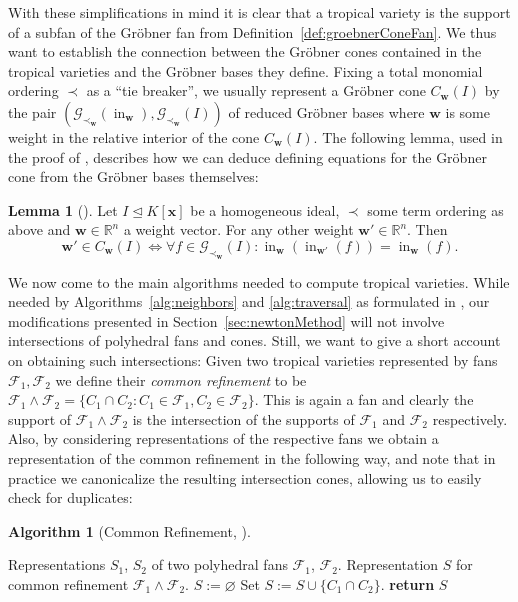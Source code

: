 \documentclass[
  paper=a4,
  titlepage,
  bibliography=totoc,
  pagesize=pdftex
]{scrartcl}
\numberwithin{figure}{section}
\numberwithin{equation}{section}
\numberwithin{table}{section}
\newcommand*\setR{\mathds{R}}
\let\vec\mathbf
\let\idealof\trianglelefteq
\DeclareMathOperator{\initial}{in}
\theoremstyle{definition}
\newtheorem{lemma}[definition]{Lemma}
\newtheorem{algo}[definition]{Algorithm}
\numberwithin{definition}{section}
\begin{document}
With these simplifications in mind it is clear that a tropical variety is the support of a
subfan of the Gröbner fan from Definition~\ref{def:groebnerConeFan}. We thus want to
establish the connection between the Gröbner cones contained in the tropical varieties and
the Gröbner bases they define. Fixing a total monomial ordering $\prec$ as a \enquote{tie
breaker}, we usually represent a Gröbner cone $C_{\vec w}(I)$ by the pair $(\mathcal
G_{\prec_{\vec w}}(\initial_{\vec w}), \mathcal G_{\prec_{\vec w}}(I))$ of reduced Gröbner
bases where $\vec w$ is some weight in the relative interior of the cone $C_{\vec w}(I)$.
The following lemma, used in the proof of \cite[Proposition~2.3]{SturmGBCP}, describes how
we can deduce defining equations for the Gröbner cone from the Gröbner bases themselves:

\begin{lemma}[{\cite[Lemma~4.2]{compTropVar}}]
  \label{lem:grConEq}
  Let $I \idealof K[\vec x]$ be a homogeneous ideal, $\prec$ some term ordering as above
  and $\vec w \in \setR^n$ a weight vector. For any other weight $\vec w' \in \setR^n$.
  Then
  \[
    \vec w' \in C_{\vec w}(I) \iff
    \forall f \in \mathcal G_{\prec_{\vec w}}(I) :
    \initial_{\vec w}(\initial_{\vec w'}(f)) = \initial_{\vec w}(f).
  \]
\end{lemma}

We now come to the main algorithms needed to compute tropical varieties. While needed by
Algorithms~\ref{alg:neighbors} and \ref{alg:traversal} as formulated in
\cite{compTropVar}, our modifications presented in Section~\ref{sec:newtonMethod} will not
involve intersections of polyhedral fans and cones. Still, we want to give a short account
on obtaining such intersections: Given two tropical varieties represented by fans
$\mathcal F_1, \mathcal F_2$ we define their \emph{common refinement} to be $\mathcal F_1
\wedge \mathcal F_2 = \{ C_1 \cap C_2 : C_1 \in \mathcal F_1, C_2 \in \mathcal F_2 \}$.
This is again a fan and clearly the support of $\mathcal F_1 \wedge \mathcal F_2$ is the
intersection of the supports of $\mathcal F_1$ and $\mathcal F_2$ respectively. Also, by
considering representations of the respective fans we obtain a representation of the
common refinement in the following way, and note that in practice we canonicalize the
resulting intersection cones, allowing us to easily check for duplicates:

\begin{algo}[Common Refinement, {\cite[Algorithm~4.4]{compTropVar}}]\
  \label{alg:fanRefinement}
  \begin{algorithmic}[1]
    \Require Representations $S_1$, $S_2$ of two polyhedral fans $\mathcal
      F_1$, $\mathcal F_2$.
    \Ensure Representation $S$ for common refinement $\mathcal F_1 \wedge \mathcal F_2$.
    \State $S := \varnothing$
      \State Set $S := S \cup \{ C_1 \cap C_2 \}$.
    \EndFor
    \State\textbf{return} $S$
  \end{algorithmic}
\end{algo}
\end{document}

